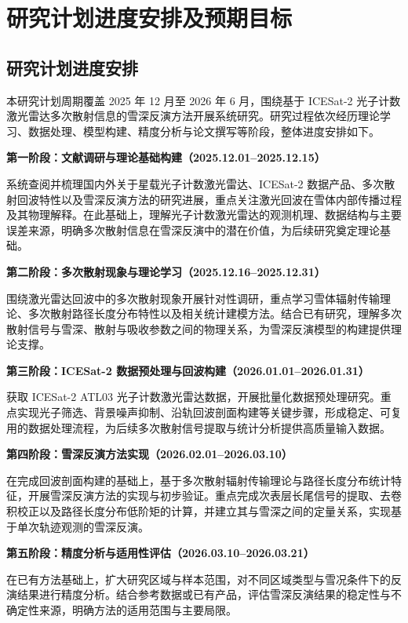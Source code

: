 \section{研究计划进度安排及预期目标}

\subsection{研究计划进度安排}

本研究计划周期覆盖 2025 年 12 月至 2026 年 6 月，围绕基于 ICESat-2 光子计数激光雷达多次散射信息的雪深反演方法开展系统研究。研究过程依次经历理论学习、数据处理、模型构建、精度分析与论文撰写等阶段，整体进度安排如下。

\textbf{第一阶段：文献调研与理论基础构建（2025.12.01--2025.12.15）}

系统查阅并梳理国内外关于星载光子计数激光雷达、ICESat-2 数据产品、多次散射回波特性以及雪深反演方法的研究进展，重点关注激光回波在雪体内部传播过程及其物理解释。在此基础上，理解光子计数激光雷达的观测机理、数据结构与主要误差来源，明确多次散射信息在雪深反演中的潜在价值，为后续研究奠定理论基础。

\textbf{第二阶段：多次散射现象与理论学习（2025.12.16--2025.12.31）}

围绕激光雷达回波中的多次散射现象开展针对性调研，重点学习雪体辐射传输理论、多次散射路径长度分布特性以及相关统计建模方法。结合已有研究，理解多次散射信号与雪深、散射与吸收参数之间的物理关系，为雪深反演模型的构建提供理论支撑。

\textbf{第三阶段：ICESat-2 数据预处理与回波构建（2026.01.01--2026.01.31）}

获取 ICESat-2 ATL03 光子计数激光雷达数据，开展批量化数据预处理研究。重点实现光子筛选、背景噪声抑制、沿轨回波剖面构建等关键步骤，形成稳定、可复用的数据处理流程，为后续多次散射信号提取与统计分析提供高质量输入数据。

\textbf{第四阶段：雪深反演方法实现（2026.02.01--2026.03.10）}

在完成回波剖面构建的基础上，基于多次散射辐射传输理论与路径长度分布统计特征，开展雪深反演方法的实现与初步验证。重点完成次表层长尾信号的提取、去卷积校正以及路径长度分布低阶矩的计算，并建立其与雪深之间的定量关系，实现基于单次轨迹观测的雪深反演。

\textbf{第五阶段：精度分析与适用性评估（2026.03.10--2026.03.21）}

在已有方法基础上，扩大研究区域与样本范围，对不同区域类型与雪况条件下的反演结果进行精度分析。结合参考数据或已有产品，评估雪深反演结果的稳定性与不确定性来源，明确方法的适用范围与主要局限。


